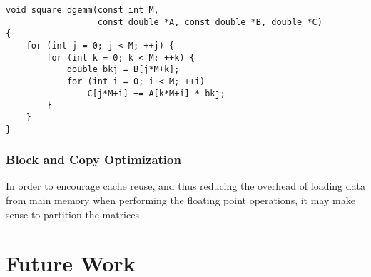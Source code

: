 \documentclass[paper=a4, fontsize=11pt]{scrartcl}
\numberwithin{equation}{section}        %
\numberwithin{figure}{section}          %
\numberwithin{table}{section}               %
\begin{document}
\begin{lstlisting}[frame = single, caption={Improved Loop Order Square Matrix Multiply}]
void square dgemm(const int M, 
                  const double *A, const double *B, double *C)
{
    for (int j = 0; j < M; ++j) {
        for (int k = 0; k < M; ++k) {
            double bkj = B[j*M+k];
            for (int i = 0; i < M; ++i)
                C[j*M+i] += A[k*M+i] * bkj;
        }
    }
}
\end{lstlisting}


\subsubsection{Block and Copy Optimization}
In order to encourage cache reuse, and thus reducing the overhead of loading 
data from main memory when performing the floating point operations, it may make
sense to partition the matrices 

\section{Future Work}

\end{document}
